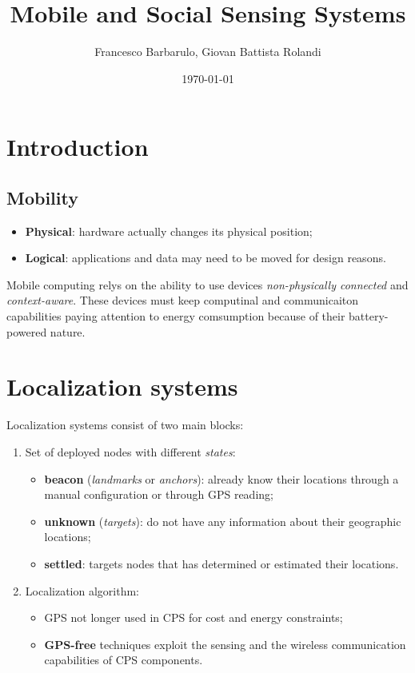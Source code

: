 \documentclass[a4paper,12pt]{article}
\title{Mobile and Social Sensing Systems}
\author{Francesco Barbarulo, Giovan Battista Rolandi}
\date{\monthyeardate\today}
\begin{document}

\maketitle
{}

\tableofcontents

\newpage


\section{Introduction}
\subsection{Mobility}
\begin{itemize}
    \item \textbf{Physical}: hardware actually changes its physical position;
    \item \textbf{Logical}: applications and data may need to be moved for design reasons.
\end{itemize}

Mobile computing relys on the ability to use devices \textit{non-physically connected} and \textit{context-aware}. These devices must keep computinal and communicaiton capabilities paying attention to energy comsumption because of their battery-powered nature.

\section{Localization systems}
Localization systems consist of two main blocks:
\begin{enumerate}[label=(\roman*)]
	\item Set of deployed nodes with different \textit{states}:
		\begin{itemize}
		 	\item \textbf{beacon} (\textit{landmarks} or \textit{anchors}): already know their locations through a manual configuration or through GPS reading;
		  	\item \textbf{unknown} (\textit{targets}): do not have any information about their geographic locations;
		  	\item \textbf{settled}: targets nodes that has determined or estimated their locations.
		\end{itemize}
	\item Localization algorithm:
		\begin{itemize}
			\item GPS not longer used in CPS for cost and energy constraints;
			\item \textbf{GPS-free} techniques exploit the sensing and the wireless communication capabilities of CPS components.
		\end{itemize}
\end{enumerate}
\end{document}
